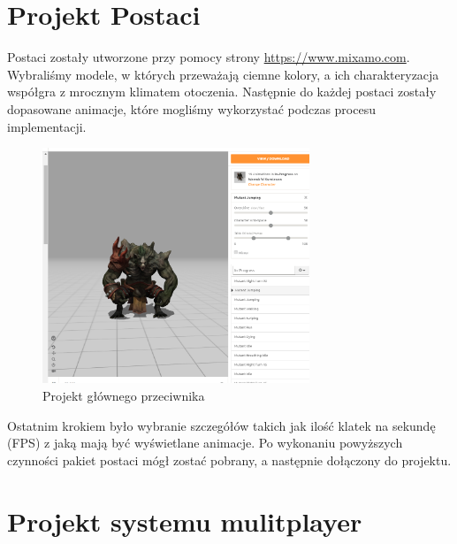 \documentclass[openright]{xmgr}
\begin{document}
  \section{Projekt Postaci}

    Postaci zostały utworzone przy pomocy strony \url{https://www.mixamo.com}. Wybraliśmy modele, w których przeważają ciemne kolory, a ich charakteryzacja współgra z mrocznym klimatem otoczenia. 
    Następnie do każdej postaci zostały dopasowane animacje, które mogliśmy wykorzystać podczas procesu implementacji.
    \begin{figure}[H]
      \center
      \includegraphics[width=8cm]{mixamo.png}
      \caption{Projekt głównego przeciwnika}
    \end{figure}
    Ostatnim krokiem było wybranie szczegółów takich jak ilość klatek na sekundę (FPS) z jaką mają być wyświetlane animacje. 
    Po wykonaniu powyższych czynności pakiet postaci mógł zostać pobrany, a następnie dołączony do projektu.

  \section{Projekt systemu mulitplayer}
\end{document}
